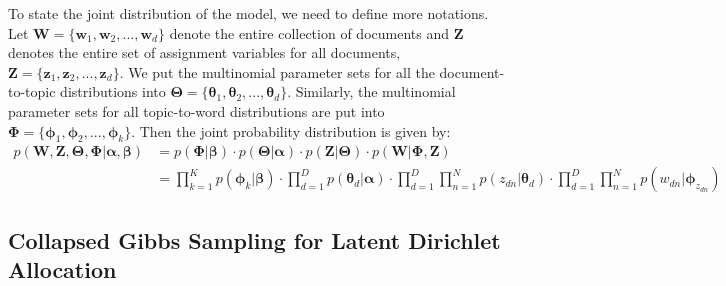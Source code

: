 To state the joint distribution of the model, we need to define more notations. Let $\boldsymbol{W}=\{\boldsymbol{w}_1, \boldsymbol{w}_2, ..., \boldsymbol{w}_d\}$ denote the entire collection of documents and $\boldsymbol{Z}$ denotes the entire set of assignment variables for all documents, $\boldsymbol{Z} = \{\boldsymbol{z}_1, \boldsymbol{z}_2, ..., \boldsymbol{z}_d\}$. We put the multinomial parameter sets for all the document-to-topic distributions into $\boldsymbol{\Theta}=\{\boldsymbol{\theta}_{1}, \boldsymbol{\theta}_{2}, ..., \boldsymbol{\theta}_{d}\}$. Similarly, the multinomial parameter sets for all topic-to-word distributions are put into $\boldsymbol{\Phi}=\{\boldsymbol{\phi}_1, \boldsymbol{\phi}_2, ..., \boldsymbol{\phi}_k\}$. Then the joint probability distribution is given by:
\begin{equation}
\begin{aligned}
p(\boldsymbol{W}, \boldsymbol{Z}, \boldsymbol{\Theta}, \boldsymbol{\Phi} \vert \boldsymbol{\alpha}, \boldsymbol{\beta}) &= p(\boldsymbol{\Phi} \vert \boldsymbol{\beta}) \cdot p(\boldsymbol{\Theta} \vert \boldsymbol{\alpha}) \cdot p(\boldsymbol{Z} \vert \boldsymbol{\Theta}) \cdot  p(\boldsymbol{W} \vert \boldsymbol{\Phi}, \boldsymbol{Z}) \\
                                                                                                                                                                                          &= \prod_{k=1}^{K} p(\boldsymbol{\phi}_k \vert \boldsymbol{\beta}) \cdot \prod_{d=1}^{D} p(\boldsymbol{\theta}_d \vert \boldsymbol{\alpha}) \cdot \prod_{d=1}^{D} \prod_{n=1}^{N} p(z_{dn} \vert \boldsymbol{\theta}_d) \cdot \prod_{d=1}^{D} \prod_{n=1}^{N} p(w_{dn} \vert \boldsymbol{\phi}_{z_{dn}})
\end{aligned}
\label{eq:background-lda-full-joint}
\end{equation}

\subsection{Collapsed Gibbs Sampling for Latent Dirichlet Allocation}

